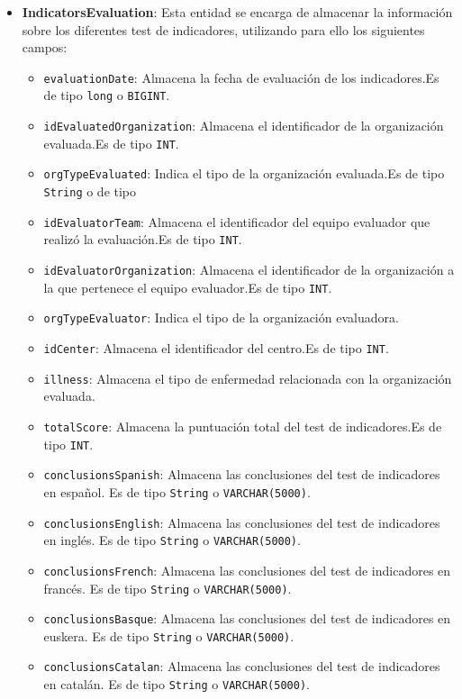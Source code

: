 \begin{itemize}
   
    \item \textbf{IndicatorsEvaluation}: Esta entidad se encarga de almacenar la información sobre los diferentes test de indicadores, utilizando para ello los siguientes campos:
    \begin{itemize}
      \item \texttt{evaluationDate}: Almacena la fecha de evaluación de los indicadores.Es de tipo \texttt{long} o \texttt{BIGINT}.
      \item \texttt{idEvaluatedOrganization}: Almacena el identificador de la organización evaluada.Es de tipo \texttt{INT}.
      \item \texttt{orgTypeEvaluated}: Indica el tipo de la organización evaluada.Es de tipo \texttt{String} o de tipo
      \item \texttt{idEvaluatorTeam}: Almacena el identificador del equipo evaluador que realizó la evaluación.Es de tipo \texttt{INT}.
      \item \texttt{idEvaluatorOrganization}: Almacena el identificador de la organización a la que pertenece el equipo evaluador.Es de tipo \texttt{INT}.
      \item \texttt{orgTypeEvaluator}: Indica el tipo de la organización evaluadora.
      \item \texttt{idCenter}: Almacena el identificador del centro.Es de tipo \texttt{INT}.
      \item \texttt{illness}: Almacena el tipo de enfermedad relacionada con la organización evaluada.
      \item \texttt{totalScore}: Almacena la puntuación total del test de indicadores.Es de tipo \texttt{INT}.
      \item \texttt{conclusionsSpanish}: Almacena las conclusiones del test de indicadores en español. Es de tipo \texttt{String} o \texttt{VARCHAR(5000)}.
      \item \texttt{conclusionsEnglish}: Almacena las conclusiones del test de indicadores en inglés. Es de tipo \texttt{String} o \texttt{VARCHAR(5000)}.
      \item \texttt{conclusionsFrench}: Almacena las conclusiones del test de indicadores en francés. Es de tipo \texttt{String} o \texttt{VARCHAR(5000)}.
      \item \texttt{conclusionsBasque}: Almacena las conclusiones del test de indicadores en euskera. Es de tipo \texttt{String} o \texttt{VARCHAR(5000)}.
      \item \texttt{conclusionsCatalan}: Almacena las conclusiones del test de indicadores en catalán. Es de tipo \texttt{String} o \texttt{VARCHAR(5000)}.

\end{itemize}
\end{itemize}
